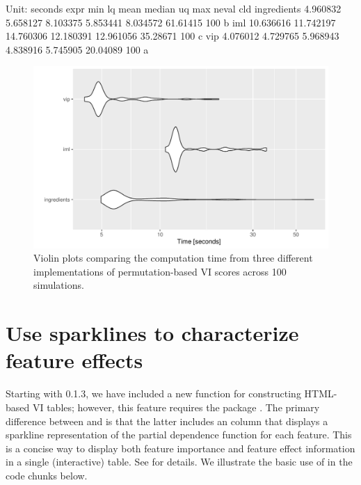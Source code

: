 \begin{example}
Unit: seconds
        expr       min        lq      mean    median        uq      max neval cld
 ingredients  4.960832  5.658127  8.103375  5.853441  8.034572 61.61415   100  b 
         iml 10.636616 11.742197 14.760306 12.180391 12.961056 35.28671   100   c
         vip  4.076012  4.729765  5.968943  4.838916  5.745905 20.04089   100 a
\end{example}

\begin{figure}[!htb]
  \centering
  \includegraphics[width=1\linewidth]{figures/benchmark}
  \caption{Violin plots comparing the computation time from three different implementations of permutation-based VI scores across 100 simulations.}
  \label{fig:vip-permute-nn-all}
\end{figure}


\section{Use sparklines to characterize feature effects}

Starting with  0.1.3, we have included a new function  for constructing HTML-based VI tables; however, this feature requires the  package \citep{DT-pkg}. The primary difference between  and  is that the latter includes an  column that displays a sparkline representation of the partial dependence function for each feature. This is a concise way to display both feature importance and feature effect information in a single (interactive) table. See  for details. We illustrate the basic use of  in the code chunks below.


